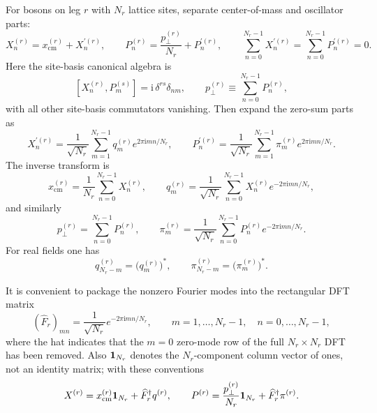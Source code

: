 \documentclass[11pt]{article}
\numberwithin{equation}{section}
\newcommand{\ii}{\mathrm{i}}
\begin{document}
For bosons on leg $r$ with $N_r$ lattice sites, separate center-of-mass and oscillator parts:
\begin{equation}
\label{eq:s10-001}
X_n^{(r)} = x_{\mathrm{cm}}^{(r)} + X_n^{\prime(r)},
\qquad
P_n^{(r)} = \frac{p_\perp^{(r)}}{N_r} + P_n^{\prime(r)},
\qquad
\sum_{n=0}^{N_r-1}X_n^{\prime(r)}=\sum_{n=0}^{N_r-1}P_n^{\prime(r)}=0.
\end{equation}
Here the site-basis canonical algebra is
\begin{equation}
\label{eq:s10-002}
[X_n^{(r)},P_m^{(s)}]=\ii\,\delta^{rs}\delta_{nm},
\qquad
p_\perp^{(r)}\equiv \sum_{n=0}^{N_r-1}P_n^{(r)},
\end{equation}
with all other site-basis commutators vanishing.
Then expand the zero-sum parts as
\begin{equation}
\label{eq:s10-003}
X_n^{\prime(r)} = \frac{1}{\sqrt{N_r}}\sum_{m=1}^{N_r-1} q_m^{(r)} e^{2\pi \ii mn/N_r},
\qquad
P_n^{\prime(r)} = \frac{1}{\sqrt{N_r}}\sum_{m=1}^{N_r-1} \pi_m^{(r)} e^{2\pi \ii mn/N_r}.
\end{equation}
The inverse transform is
\begin{equation}
\label{eq:s10-004}
x_{\mathrm{cm}}^{(r)} = \frac{1}{N_r}\sum_{n=0}^{N_r-1} X_n^{(r)},
\qquad
q_m^{(r)} = \frac{1}{\sqrt{N_r}}\sum_{n=0}^{N_r-1} X_n^{(r)} e^{-2\pi \ii mn/N_r},
\end{equation}
and similarly
\begin{equation}
\label{eq:s10-005}
p_\perp^{(r)} = \sum_{n=0}^{N_r-1} P_n^{(r)},
\qquad
\pi_m^{(r)} = \frac{1}{\sqrt{N_r}}\sum_{n=0}^{N_r-1} P_n^{(r)} e^{-2\pi \ii mn/N_r}.
\end{equation}
For real fields one has
\begin{equation}
\label{eq:s10-006}
q_{N_r-m}^{(r)} = \bigl(q_m^{(r)}\bigr)^*,
\qquad
\pi_{N_r-m}^{(r)} = \bigl(\pi_m^{(r)}\bigr)^*.
\end{equation}

It is convenient to package the nonzero Fourier modes into the rectangular DFT matrix
\begin{equation}
\label{eq:s10-007}
(\widehat F_r)_{mn} = \frac{1}{\sqrt{N_r}} e^{-2\pi \ii mn/N_r},
\qquad
m=1,\dots,N_r-1,\quad n=0,\dots,N_r-1,
\end{equation}
where the hat indicates that the $m=0$ zero-mode row of the full $N_r\times N_r$ DFT has been removed. Also ${\bf 1}_{N_r}$ denotes the $N_r$-component column vector of ones, not an identity matrix; with these conventions
\begin{equation}
\label{eq:s10-008}
X^{(r)} = x_{\mathrm{cm}}^{(r)}{\bf 1}_{N_r} + \widehat F_r^\dagger q^{(r)},
\qquad
P^{(r)} = \frac{p_\perp^{(r)}}{N_r}{\bf 1}_{N_r} + \widehat F_r^\dagger \pi^{(r)}.
\end{equation}
\end{document}
